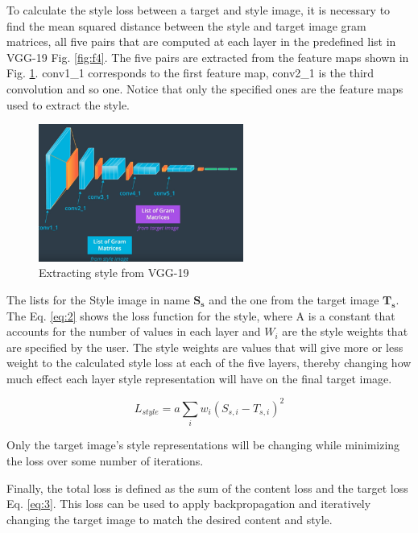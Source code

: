 \documentclass{article}
\begin{document}
To calculate the style loss between a target and style image, it is necessary to find the mean squared distance between the style and target image gram matrices, all five pairs that are computed at each layer in the predefined list in VGG-19 Fig. \ref{fig:f4}. The five pairs are extracted from the feature maps shown in Fig. \ref{fig:f9}. conv1\_1 corresponds to the first feature map, conv2\_1 is the third convolution and so one. Notice that only the specified ones are the feature maps used to extract the style.

\begin{figure}[ht]
    \centering
    \includegraphics[width=0.6\textwidth,height=0.6\textheight,keepaspectratio]{images/extracting_style.png}
    \captionsetup{justification=centering}
    \caption{Extracting style from VGG-19}
    \label{fig:f9}
\end{figure}

The lists for the Style image in name \(\boldsymbol{S_s}\) and the one from the target image \(\boldsymbol{T_s}\). The Eq. \eqref{eq:2} shows the loss function for the style, where A is a constant that accounts for the number of values in each layer and \(W_i\) are the style weights that are specified by the user. The style weights are values that will give more or less weight to the calculated style loss at each of the five layers, thereby changing how much effect each layer style representation will have on the final target image.

\begin{equation}
L_{style} = a \sum_i w_i (S_{s,i} - T_{s,i})^2
\label{eq:2}
\end{equation}

Only the target image's style representations will be changing while minimizing the loss over some number of iterations.

Finally, the total loss is defined as the sum of the content loss and the target loss Eq. \eqref{eq:3}. This loss can be used to apply backpropagation and iteratively changing the target image to match the desired content and style.
\end{document}
